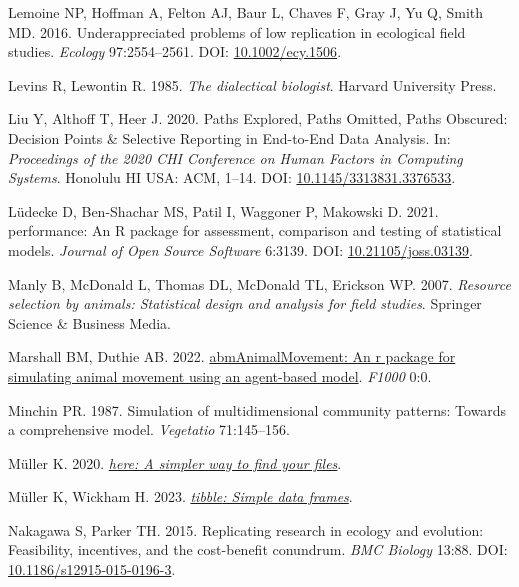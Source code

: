 \documentclass[10pt,a4paper]{article}
\newlength{\cslhangindent}
\newenvironment{CSLReferences}[2] %
 {\begin{list}{}{%
  \setlength{\itemindent}{0pt}
  \setlength{\leftmargin}{0pt}
  \setlength{\parsep}{0pt}
  \ifodd #1
   \setlength{\leftmargin}{\cslhangindent}
   \setlength{\itemindent}{-1\cslhangindent}
  \fi
  \setlength{\itemsep}{#2\baselineskip}}}
 {\end{list}}
\begin{document}
\begin{CSLReferences}{1}{0}
Lemoine NP, Hoffman A, Felton AJ, Baur L, Chaves F, Gray J, Yu Q, Smith MD. 2016. Underappreciated problems of low replication in ecological field studies. \emph{Ecology} 97:2554--2561. DOI: \href{https://doi.org/10.1002/ecy.1506}{10.1002/ecy.1506}.

Levins R, Lewontin R. 1985. \emph{The dialectical biologist}. Harvard University Press.

Liu Y, Althoff T, Heer J. 2020. Paths {Explored}, {Paths} {Omitted}, {Paths} {Obscured}: {Decision} {Points} \& {Selective} {Reporting} in {End}-to-{End} {Data} {Analysis}. In: \emph{Proceedings of the 2020 {CHI} {Conference} on {Human} {Factors} in {Computing} {Systems}}. Honolulu HI USA: ACM, 1--14. DOI: \href{https://doi.org/10.1145/3313831.3376533}{10.1145/3313831.3376533}.

Lüdecke D, Ben-Shachar MS, Patil I, Waggoner P, Makowski D. 2021. {performance}: An {R} package for assessment, comparison and testing of statistical models. \emph{Journal of Open Source Software} 6:3139. DOI: \href{https://doi.org/10.21105/joss.03139}{10.21105/joss.03139}.

Manly B, McDonald L, Thomas DL, McDonald TL, Erickson WP. 2007. \emph{Resource selection by animals: Statistical design and analysis for field studies}. Springer Science \& Business Media.

Marshall BM, Duthie AB. 2022. \href{https://0}{{abmAnimalMovement}: An r package for simulating animal movement using an agent-based model}. \emph{F1000} 0:0.

Minchin PR. 1987. Simulation of multidimensional community patterns: Towards a comprehensive model. \emph{Vegetatio} 71:145--156.

Müller K. 2020. \emph{\href{https://CRAN.R-project.org/package=here}{{here}: A simpler way to find your files}}.

Müller K, Wickham H. 2023. \emph{\href{https://CRAN.R-project.org/package=tibble}{{tibble}: Simple data frames}}.

Nakagawa S, Parker TH. 2015. Replicating research in ecology and evolution: Feasibility, incentives, and the cost-benefit conundrum. \emph{BMC Biology} 13:88. DOI: \href{https://doi.org/10.1186/s12915-015-0196-3}{10.1186/s12915-015-0196-3}.


\end{CSLReferences}
\end{document}
